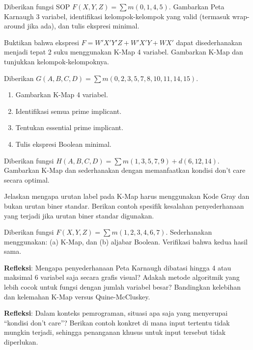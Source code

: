 \documentclass[../main]{subfiles}
\begin{document}

\begin{latihan}
  \item Diberikan fungsi SOP $F(X,Y,Z) = \sum m(0, 1, 4, 5)$. Gambarkan Peta Karnaugh 3 variabel, identifikasi kelompok-kelompok yang valid (termasuk wrap-around jika ada), dan tulis ekspresi minimal.
  \item Buktikan bahwa ekspresi $F = W'X'Y'Z + W'X'Y + WX'$ dapat disederhanakan menjadi tepat 2 suku menggunakan K-Map 4 variabel. Gambarkan K-Map dan tunjukkan kelompok-kelompoknya.
  \item Diberikan $G(A,B,C,D) = \sum m(0, 2, 3, 5, 7, 8, 10, 11, 14, 15)$.
  \begin{enumerate}
    \item Gambarkan K-Map 4 variabel.
    \item Identifikasi semua prime implicant.
    \item Tentukan essential prime implicant.
    \item Tulis ekspresi Boolean minimal.
  \end{enumerate}
  \item Diberikan fungsi $H(A,B,C,D) = \sum m(1, 3, 5, 7, 9) + d(6, 12, 14)$. Gambarkan K-Map dan sederhanakan dengan memanfaatkan kondisi don't care secara optimal.
  \item Jelaskan mengapa urutan label pada K-Map harus menggunakan Kode Gray dan bukan urutan biner standar. Berikan contoh spesifik kesalahan penyederhanaan yang terjadi jika urutan biner standar digunakan.
  \item Diberikan fungsi $F(X,Y,Z) = \sum m(1, 2, 3, 4, 6, 7)$. Sederhanakan menggunakan: (a) K-Map, dan (b) aljabar Boolean. Verifikasi bahwa kedua hasil sama.
  \item \textbf{Refleksi}: Mengapa penyederhanaan Peta Karnaugh dibatasi hingga 4 atau maksimal 6 variabel saja secara grafis visual? Adakah metode algoritmik yang lebih cocok untuk fungsi dengan jumlah variabel besar? Bandingkan kelebihan dan kelemahan K-Map versus Quine-McCluskey.
  \item \textbf{Refleksi}: Dalam konteks pemrograman, situasi apa saja yang menyerupai ``kondisi don't care''? Berikan contoh konkret di mana input tertentu tidak mungkin terjadi, sehingga penanganan khusus untuk input tersebut tidak diperlukan.
\end{latihan}
\end{document}
